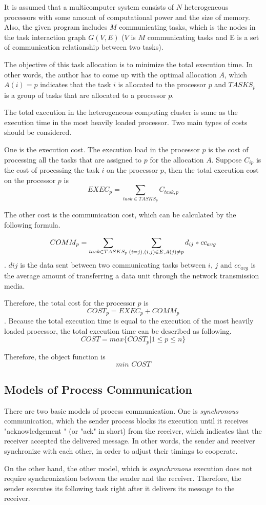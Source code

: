 It is assumed that a multicomputer system consists of $N$ heterogeneous processors with some amount of computational power and the size of memory.  Also, the given program includes $M$ communicating tasks, which is the nodes in the task interaction graph $G(V, E)$ ($V$ is $M$ communicating tasks and E is a set of communication relationship between two tasks).

The objective of this task allocation is to minimize the total execution time. In other words, the author has to come up with the optimal allocation $A$, which $A(i) = p$ indicates that the task $i$ is allocated to the processor $p$ and $TASKS_p$ is a group of tasks that are allocated to a processor $p$.

 The total execution in the heterogeneous computing cluster is same as the execution time in the most heavily loaded processor.  Two main types of costs should be considered.
 
 One is the execution cost.  The execution load in the processor $p$ is the cost of processing all the tasks that are assigned to $p$ for the allocation $A$. Suppose $C_{ip}$ is the cost of processing the task $i$ on the processor $p$, then the total execution cost on the processor $p$ is $$EXEC_p = \sum_{task \in  TASKS_p} C_{task, p}$$
 
  The other cost is the communication cost, which can be calculated by the following formula.
  
  $$COMM_p = \sum_{task \in TASKS_p} \sum_{(i=j), \\(i, j) \in E , \\ A(j) \neq p} d_{ij} * cc_{avg}$$. $d{ij}$ is the data sent between two communicating tasks between $i$, $j$ and $cc_{avg}$ is the average amount of transferring a data unit through the network transmission media.
  
 Therefore, the total cost for the processor $p$ is $$COST_p = EXEC_p + COMM_p$$.
 Because the total execution time is equal to the execution of the most heavily loaded processor, the total execution time can be described as following.
 $$ COST =  max \{COST_p | 1 \leq p \leq n\}$$
 
 Therefore, the object function is $$min \,\,COST$$

\subsection{Models of Process Communication}

There are two basic models of process communication. One is \textit{synchronous} communication, which the sender process blocks its execution until it receives "acknowledgement " (or "ack" in short) from the receiver, which indicates that the receiver accepted the delivered message. In other words, the sender and receiver synchronize with each other, in order to adjust their timings to cooperate.
\par On the other hand, the other model, which is \textit{asynchronous} execution does not require synchronization between the sender and the receiver.  Therefore, the sender executes its following task right after it delivers its message to the receiver. 

